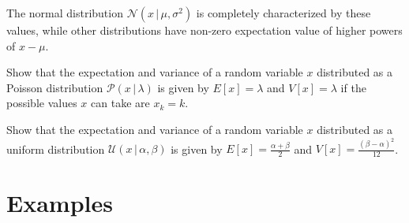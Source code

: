 \documentclass{tstextbook}
\begin{document}
The normal distribution $\mathcal{N}\left(x\,\vert\, \mu,\sigma^2\right)$ is completely characterized by these values, while other distributions have non-zero expectation value of higher powers of $x-\mu$.

\begin{exercise}
 Show that the expectation and variance of a random variable $x$ distributed as a Poisson distribution $\mathcal{P}\left(x\,\vert\,\lambda\right)$ is given by $E[x]=\lambda$ and $V[x]=\lambda$ if the possible values $x$ can take are $x_k=k$. 
\end{exercise}

\begin{exercise}
 Show that the expectation and variance of a random variable $x$ distributed as a uniform distribution $\mathcal{U}\left(x\,\vert\,\alpha,\beta\right)$ is given by $E[x]=\frac{\alpha+\beta}{2}$ and $V[x]=\frac{(\beta-\alpha)^2}{12}$.
\end{exercise}

\section{Examples}
\end{document}
